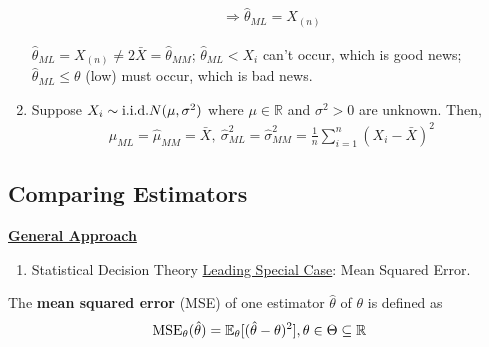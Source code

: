 \documentclass[11pt]{elegantbook}
\begin{document}
\begin{example}
\begin{enumerate}
\begin{equation}
\begin{aligned}
            \Rightarrow \hat{\theta}_{ML}=X_{(n)}
        \end{aligned}
        \nonumber
    \end{equation}
    \begin{remark}
        $\hat{\theta}_{ML}=X_{(n)}\neq 2\bar{X}=\hat{\theta}_{MM}$; $\hat{\theta}_{ML}<X_i$ can't occur, which is good news; $\hat{\theta}_{ML}\leq \theta$ (low) must occur, which is bad news.
    \end{remark}
    \item Suppose $X_i\sim \textnormal{i.i.d.}N(\mu,\sigma^2)$ where $\mu\in \mathbb{R}$ and $\sigma^2>0$ are unknown. Then,
    \begin{equation}
        \begin{aligned}
            \hat{\mu}_{ML}=\hat{\mu}_{MM}=\bar{X},\ \hat{\sigma}^2_{ML}=\hat{\sigma}^2_{MM}=\frac{1}{n}\sum_{i=1}^n (X_i-\bar{X})^2
        \end{aligned}
        \nonumber
    \end{equation}
\end{enumerate}
\end{example}

\subsection{Comparing Estimators}
\textbf{\underline{General Approach}}
\begin{enumerate}[$\circ$]
    \item Statistical Decision Theory
    \subitem \underline{Leading Special Case}: Mean Squared Error.
\end{enumerate}

\begin{definition}
    \normalfont
    The \textbf{mean squared error} (MSE) of one estimator $\hat{\theta}$ of $\theta$ is defined as
    \begin{equation}
        \begin{aligned}
            \textnormal{MSE}_\theta(\hat{\theta})=\mathbb{E}_\theta[(\hat{\theta}-\theta)^2], \theta\in \Theta\subseteq \mathbb{R}
        \end{aligned}
        \nonumber
    \end{equation}
\end{definition}
\end{document}
